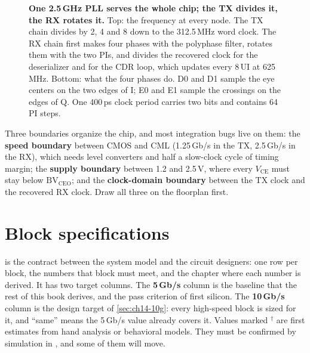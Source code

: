 \begin{figure}[!tbp]
\centering

\caption{\textbf{One 2.5\,GHz PLL serves the whole chip; the TX divides it, the RX rotates it.} Top: the frequency at every node. The TX chain divides by 2, 4 and 8 down to the 312.5\,MHz word clock. The RX chain first makes four phases with the polyphase filter, rotates them with the two PIs, and divides the recovered clock for the deserializer and for the CDR loop, which updates every 8\,UI at 625\,MHz. Bottom: what the four phases do. D0 and D1 sample the eye centers on the two edges of I; E0 and E1 sample the crossings on the edges of Q. One 400\,ps clock period carries two bits and contains 64 PI steps.}
\label{fig:ch14-clock}
\end{figure}

\begin{insight}
Three boundaries organize the chip, and most integration bugs live on them: the \textbf{speed boundary} between CMOS and CML (1.25\,Gb/s in the TX, 2.5\,Gb/s in the RX), which needs level converters and half a slow-clock cycle of timing margin; the \textbf{supply boundary} between 1.2 and 2.5\,V, where every $V_\mathrm{CE}$ must stay below $\mathrm{BV}_\mathrm{CEO}$; and the \textbf{clock-domain boundary} between the TX clock and the recovered RX clock. Draw all three on the floorplan first.
\end{insight}

\section{Block specifications}\label{sec:ch14-specs}

 is the contract between the system model and the circuit designers: one row per block, the numbers that block must meet, and the chapter where each number is derived. It has two target columns. The \textbf{5\,Gb/s} column is the baseline that the rest of this book derives, and the pass criterion of first silicon. The \textbf{10\,Gb/s} column is the design target of \cref{sec:ch14-10g}: every high-speed block is sized for it, and ``same'' means the 5\,Gb/s value already covers it. Values marked $^\dagger$ are first estimates from hand analysis or behavioral models. They must be confirmed by simulation in \sgx{}, and some of them will move.

